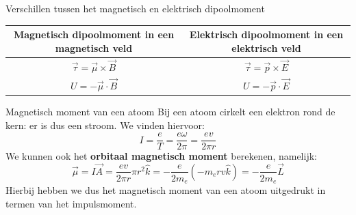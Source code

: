\begin{vrg}{Verschillen tussen het magnetisch en elektrisch dipoolmoment}
    \vspace{-0.3cm}
    \def\arraystretch{2}
    \centering
    \begin{tabular}{c|c}
       Magnetisch dipoolmoment in een magnetisch veld & Elektrisch dipoolmoment in een elektrisch veld \\ \hline
        $\Vec{\tau} = \Vec{\mu} \times \Vec{B}$ & $\Vec{\tau} = \Vec{p} \times \Vec{E}$ \\ 
        $U = -\Vec{\mu} \cdot \Vec{B}$ & $U = -\Vec{p} \cdot \Vec{E}$ \\
    \end{tabular}
    \vspace{-0.2cm}
\end{vrg}

\begin{app}{Magnetisch moment van een atoom}
    Bij een atoom cirkelt een elektron rond de kern: er is dus een stroom. We vinden hiervoor:
    \begin{equation*}
        I = \dfrac{e}{T} = \dfrac{e\omega}{2\pi} = \dfrac{ev}{2\pi r}
    \end{equation*}
    We kunnen ook het \textbf{orbitaal magnetisch moment} berekenen, namelijk: 
    \begin{equation*}
        \Vec{\mu} = I\Vec{A} = \dfrac{ev}{2\pi r} \pi r^{2} \hat{k} = -\dfrac{e}{2m_{e}}(-m_{e}rv\hat{k}) = -\dfrac{e}{2m_{e}}\Vec{L}
    \end{equation*}
    Hierbij hebben we dus het magnetisch moment van een atoom uitgedrukt in termen van het impulsmoment. 
    \vspace{0cm}
\end{app}

\newpage


